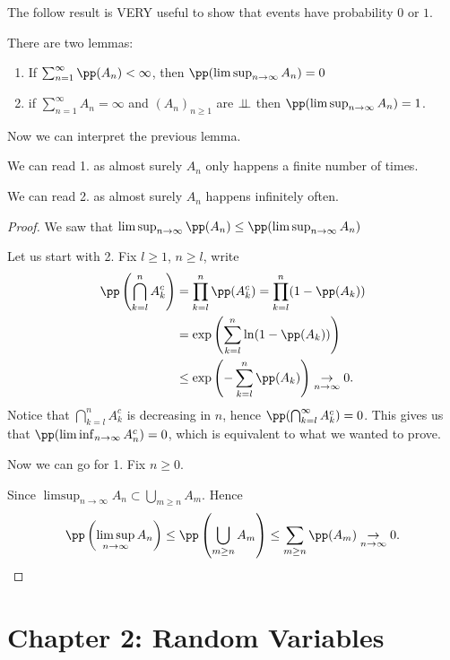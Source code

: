 \documentclass[../main.tex]{subfiles}
\begin{document}
  The follow result is VERY useful to show that events have probability $0$ or $1$.
  \begin{lemma}
    There are two lemmas:
    \begin{enumerate}
      \item If $\sum_{n=1}^{\infty} \pp(A_n) < \infty$, then $\pp(\limsup_{n \to \infty} A_n) =
        0$
      \item if $\sum_{n = 1}^{\infty} A_n = \infty$ and $(A_n)_{n \geq 1}$ are $\perp\!\!\!\!\,\perp$ then
      $\pp(\limsup_{n \to \infty} A_n) = 1$.
    \end{enumerate}
  \end{lemma}
  Now we can interpret the previous lemma. 

  We can read 1. as almost surely $A_n$ only
  happens a finite number of times.

  We can read 2. as almost surely $A_n$ happens infinitely often.

  \begin{proof}
    We saw that $\limsup_{n \to \infty}\pp(A_n) \leq \pp(\limsup_{n \to \infty} A_n) $

    Let us start with 2. Fix $l \geq 1$, $n \geq l$, write 
    \begin{align*}
      \pp\left(\bigcap_{k=l}^n A_k^c\right) &=
    \prod_{k=l}^n \pp(A_k^c) = \prod_{k=l}^n (1 - \pp(A_k)) \\
      &= \exp\left(\sum_{k=l}^n \ln(1 - \pp(A_k))\right) \\
      &\leq \exp \left( - \sum_{k = l}^n \pp(A_k) \right) \underset{n \to \infty}{\rightarrow}
      0.
    \end{align*}
    Notice that $\bigcap_{k=l}^n A_k^c$ is decreasing in $n$, hence $\pp(\bigcap_{k=l}^\infty
    A_k^c) = 0$. This gives us that $\pp(\liminf_{n \to \infty} A_n^c) = 0$, which is
    equivalent to what we wanted to prove.

    \vspace{0.3em}

    Now we can go for 1. Fix $n \geq 0$.

    Since $\limsup_{n \to \infty} A_n \subset \bigcup_{m \geq n} A_m$. Hence 
    \[
    \pp \left( \limsup_{n \to \infty} A_n \right) \leq \pp \left( \bigcup_{m \geq n} A_m
    \right) \leq \sum_{m \geq n} \pp(A_m) \underset{n \to \infty}{\rightarrow} 0
    .\] 
  \end{proof}

  \section{Chapter 2: Random Variables}
\end{document}
